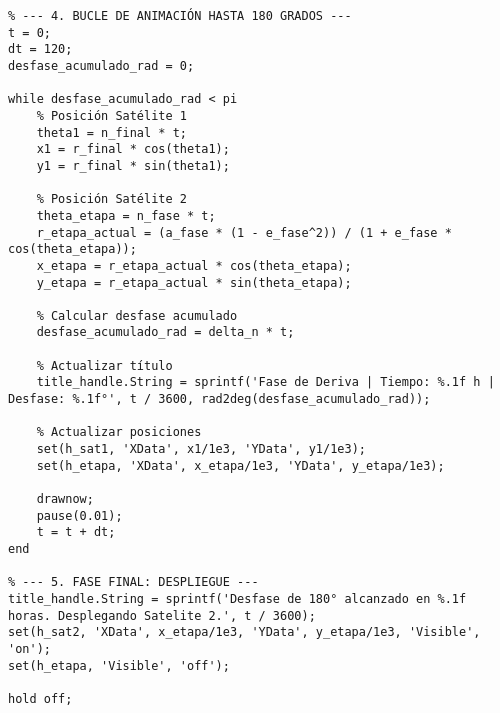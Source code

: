 \begin{verbatim}
% --- 4. BUCLE DE ANIMACIÓN HASTA 180 GRADOS ---
t = 0;
dt = 120;
desfase_acumulado_rad = 0;

while desfase_acumulado_rad < pi
    % Posición Satélite 1
    theta1 = n_final * t;
    x1 = r_final * cos(theta1);
    y1 = r_final * sin(theta1);
    
    % Posición Satélite 2
    theta_etapa = n_fase * t;
    r_etapa_actual = (a_fase * (1 - e_fase^2)) / (1 + e_fase * cos(theta_etapa));
    x_etapa = r_etapa_actual * cos(theta_etapa);
    y_etapa = r_etapa_actual * sin(theta_etapa);
    
    % Calcular desfase acumulado
    desfase_acumulado_rad = delta_n * t;
    
    % Actualizar título
    title_handle.String = sprintf('Fase de Deriva | Tiempo: %.1f h | Desfase: %.1f°', t / 3600, rad2deg(desfase_acumulado_rad));
    
    % Actualizar posiciones
    set(h_sat1, 'XData', x1/1e3, 'YData', y1/1e3);
    set(h_etapa, 'XData', x_etapa/1e3, 'YData', y_etapa/1e3);
    
    drawnow;
    pause(0.01);
    t = t + dt;
end

% --- 5. FASE FINAL: DESPLIEGUE ---
title_handle.String = sprintf('Desfase de 180° alcanzado en %.1f horas. Desplegando Satelite 2.', t / 3600);
set(h_sat2, 'XData', x_etapa/1e3, 'YData', y_etapa/1e3, 'Visible', 'on');
set(h_etapa, 'Visible', 'off');

hold off;


\end{verbatim}